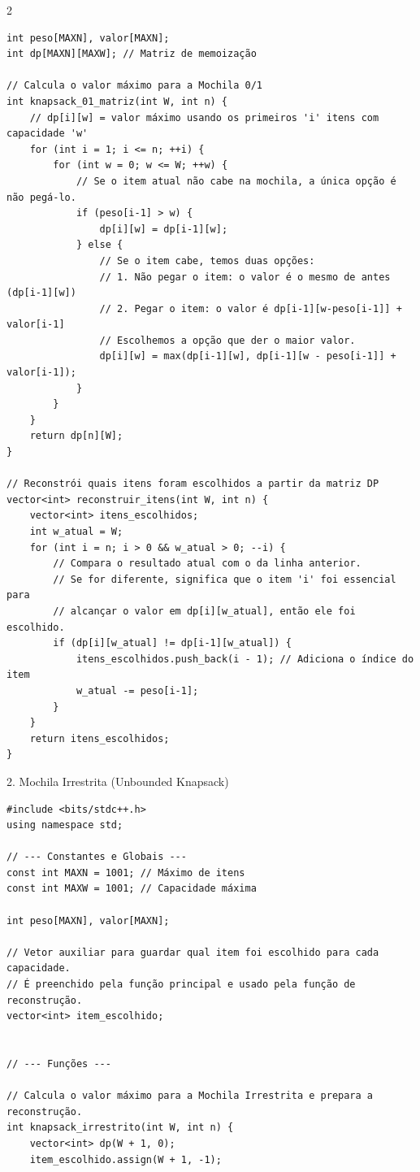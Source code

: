\documentclass[11pt]{article}
\begin{document}
\begin{multicols}{2}
\begin{lstlisting}
int peso[MAXN], valor[MAXN];
int dp[MAXN][MAXW]; // Matriz de memoização

// Calcula o valor máximo para a Mochila 0/1
int knapsack_01_matriz(int W, int n) {
    // dp[i][w] = valor máximo usando os primeiros 'i' itens com capacidade 'w'
    for (int i = 1; i <= n; ++i) {
        for (int w = 0; w <= W; ++w) {
            // Se o item atual não cabe na mochila, a única opção é não pegá-lo.
            if (peso[i-1] > w) {
                dp[i][w] = dp[i-1][w];
            } else {
                // Se o item cabe, temos duas opções:
                // 1. Não pegar o item: o valor é o mesmo de antes (dp[i-1][w])
                // 2. Pegar o item: o valor é dp[i-1][w-peso[i-1]] + valor[i-1]
                // Escolhemos a opção que der o maior valor.
                dp[i][w] = max(dp[i-1][w], dp[i-1][w - peso[i-1]] + valor[i-1]);
            }
        }
    }
    return dp[n][W];
}

// Reconstrói quais itens foram escolhidos a partir da matriz DP
vector<int> reconstruir_itens(int W, int n) {
    vector<int> itens_escolhidos;
    int w_atual = W;
    for (int i = n; i > 0 && w_atual > 0; --i) {
        // Compara o resultado atual com o da linha anterior.
        // Se for diferente, significa que o item 'i' foi essencial para
        // alcançar o valor em dp[i][w_atual], então ele foi escolhido.
        if (dp[i][w_atual] != dp[i-1][w_atual]) {
            itens_escolhidos.push_back(i - 1); // Adiciona o índice do item
            w_atual -= peso[i-1];
        }
    }
    return itens_escolhidos;
}
\end{lstlisting}

2. Mochila Irrestrita (Unbounded Knapsack)
\begin{lstlisting}
#include <bits/stdc++.h>
using namespace std;

// --- Constantes e Globais ---
const int MAXN = 1001; // Máximo de itens
const int MAXW = 1001; // Capacidade máxima

int peso[MAXN], valor[MAXN];

// Vetor auxiliar para guardar qual item foi escolhido para cada capacidade.
// É preenchido pela função principal e usado pela função de reconstrução.
vector<int> item_escolhido;


// --- Funções ---

// Calcula o valor máximo para a Mochila Irrestrita e prepara a reconstrução.
int knapsack_irrestrito(int W, int n) {
    vector<int> dp(W + 1, 0);
    item_escolhido.assign(W + 1, -1);


\end{lstlisting}
\end{multicols}
\end{document}
